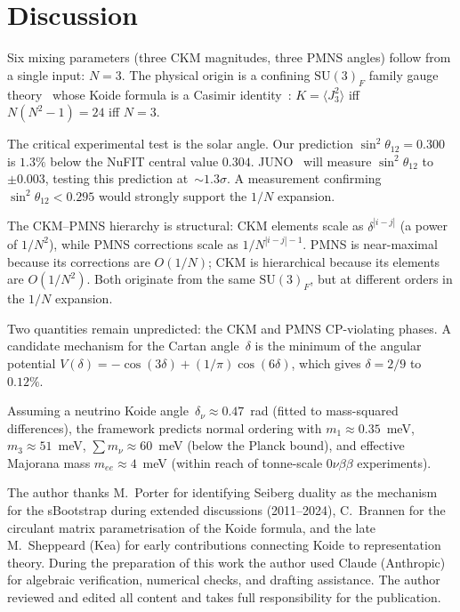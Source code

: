 \documentclass[aps,prl,twocolumn,showpacs,preprintnumbers]{revtex4-2}
\newcommand{\SU}{\mathrm{SU}}
\begin{document}
\section{Discussion}

Six mixing parameters (three CKM magnitudes, three PMNS angles)
follow from a single input: $N = 3$.
The physical origin is a confining $\SU(3)_F$ family gauge
theory~\cite{Rivero:2024} whose Koide formula is a Casimir
identity~\cite{CasimirKoide}: $K = \langle J_3^2\rangle$
iff $N(N^2{-}1) = 24$ iff $N = 3$.

The critical experimental test is the solar angle.
Our prediction $\sin^2\theta_{12} = 0.300$ is $1.3\%$
below the NuFIT central value $0.304$.
JUNO~\cite{JUNO} will measure $\sin^2\theta_{12}$ to~$\pm 0.003$,
testing this prediction at~$\sim 1.3\sigma$.
A measurement confirming $\sin^2\theta_{12} < 0.295$ would
strongly support the $1/N$ expansion.

The CKM--PMNS hierarchy is structural:
CKM elements scale as $\delta^{|i-j|}$ (a power of $1/N^2$),
while PMNS corrections scale as $1/N^{|i-j|-1}$.
PMNS is near-maximal because its corrections are $O(1/N)$;
CKM is hierarchical because its elements are $O(1/N^2)$.
Both originate from the same $\SU(3)_F$, but at different orders
in the $1/N$ expansion.

Two quantities remain unpredicted: the CKM and PMNS CP-violating
phases.
A candidate mechanism for the Cartan angle~$\delta$ is the
minimum of the angular potential
$V(\delta) = -\cos(3\delta) + (1/\pi)\cos(6\delta)$,
which gives $\delta = 2/9$ to~$0.12\%$.

Assuming a neutrino Koide angle~$\delta_\nu \approx 0.47$~rad
(fitted to mass-squared differences), the framework predicts
normal ordering with $m_1 \approx 0.35$~meV, $m_3 \approx 51$~meV,
$\sum m_\nu \approx 60$~meV (below the Planck bound), and
effective Majorana mass $m_{ee} \approx 4$~meV (within
reach of tonne-scale $0\nu\beta\beta$ experiments).

\begin{acknowledgments}
The author thanks M.~Porter for identifying Seiberg duality
as the mechanism for the sBootstrap during extended discussions
(2011--2024), C.~Brannen for the circulant matrix parametrisation
of the Koide formula, and the late M.~Sheppeard (Kea) for
early contributions connecting Koide to representation theory.
During the preparation of this work the author used Claude
(Anthropic) for algebraic verification, numerical checks,
and drafting assistance.
The author reviewed and edited all content and takes full
responsibility for the publication.
\end{acknowledgments}
\end{document}
